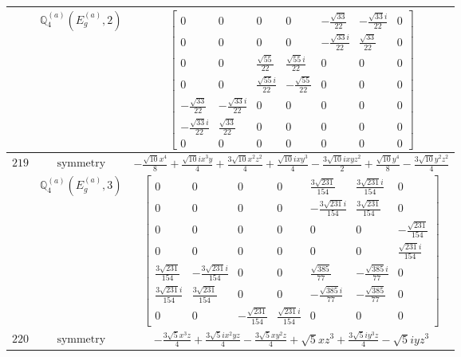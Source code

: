 \documentclass[fleqn,8pt,landscape]{jsarticle}
\begin{document}
\begin{longtable}{ccc}
$  $ & $ \mathbb{Q}_{4}^{(a)}(E_{g}^{(a)},2) $ & $ \begin{bmatrix} 0 & 0 & 0 & 0 & - \frac{\sqrt{33}}{22} & - \frac{\sqrt{33} i}{22} & 0 \\ 0 & 0 & 0 & 0 & - \frac{\sqrt{33} i}{22} & \frac{\sqrt{33}}{22} & 0 \\ 0 & 0 & \frac{\sqrt{55}}{22} & \frac{\sqrt{55} i}{22} & 0 & 0 & 0 \\ 0 & 0 & \frac{\sqrt{55} i}{22} & - \frac{\sqrt{55}}{22} & 0 & 0 & 0 \\ - \frac{\sqrt{33}}{22} & - \frac{\sqrt{33} i}{22} & 0 & 0 & 0 & 0 & 0 \\ - \frac{\sqrt{33} i}{22} & \frac{\sqrt{33}}{22} & 0 & 0 & 0 & 0 & 0 \\ 0 & 0 & 0 & 0 & 0 & 0 & 0 \end{bmatrix} $ \\ \hline
$ 219 $ & $ \text{symmetry} $ & $ - \frac{\sqrt{10} x^{4}}{8} + \frac{\sqrt{10} i x^{3} y}{4} + \frac{3 \sqrt{10} x^{2} z^{2}}{4} + \frac{\sqrt{10} i x y^{3}}{4} - \frac{3 \sqrt{10} i x y z^{2}}{2} + \frac{\sqrt{10} y^{4}}{8} - \frac{3 \sqrt{10} y^{2} z^{2}}{4} $ \\
$  $ & $ \mathbb{Q}_{4}^{(a)}(E_{g}^{(a)},3) $ & $ \begin{bmatrix} 0 & 0 & 0 & 0 & \frac{3 \sqrt{231}}{154} & \frac{3 \sqrt{231} i}{154} & 0 \\ 0 & 0 & 0 & 0 & - \frac{3 \sqrt{231} i}{154} & \frac{3 \sqrt{231}}{154} & 0 \\ 0 & 0 & 0 & 0 & 0 & 0 & - \frac{\sqrt{231}}{154} \\ 0 & 0 & 0 & 0 & 0 & 0 & \frac{\sqrt{231} i}{154} \\ \frac{3 \sqrt{231}}{154} & - \frac{3 \sqrt{231} i}{154} & 0 & 0 & \frac{\sqrt{385}}{77} & - \frac{\sqrt{385} i}{77} & 0 \\ \frac{3 \sqrt{231} i}{154} & \frac{3 \sqrt{231}}{154} & 0 & 0 & - \frac{\sqrt{385} i}{77} & - \frac{\sqrt{385}}{77} & 0 \\ 0 & 0 & - \frac{\sqrt{231}}{154} & \frac{\sqrt{231} i}{154} & 0 & 0 & 0 \end{bmatrix} $ \\ \hline
$ 220 $ & $ \text{symmetry} $ & $ - \frac{3 \sqrt{5} x^{3} z}{4} + \frac{3 \sqrt{5} i x^{2} y z}{4} - \frac{3 \sqrt{5} x y^{2} z}{4} + \sqrt{5} x z^{3} + \frac{3 \sqrt{5} i y^{3} z}{4} - \sqrt{5} i y z^{3} $ \\

\end{longtable}
\end{document}

